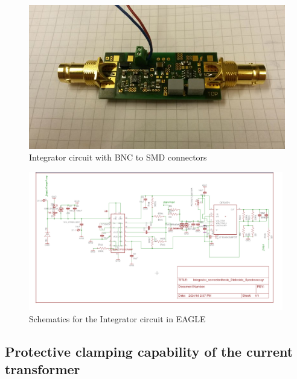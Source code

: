 \begin{figure}[h!tb]
\includegraphics[width=\textwidth]{figures/Method/integrator/realintegrator.jpg}
\caption[Kurze Abbildungsbeschreibung]{Integrator circuit with BNC to SMD connectors}
\label{fig.realcircuit}
\end{figure}
    
    
    
\begin{figure}
\includegraphics[width=0.99\textwidth]{figures/Method/integrator/schematic.jpg}
 \caption{Schematics for the Integrator circuit in EAGLE}
 \end{figure}


\subsection{Protective clamping capability of the current transformer}
\label{clamping}

